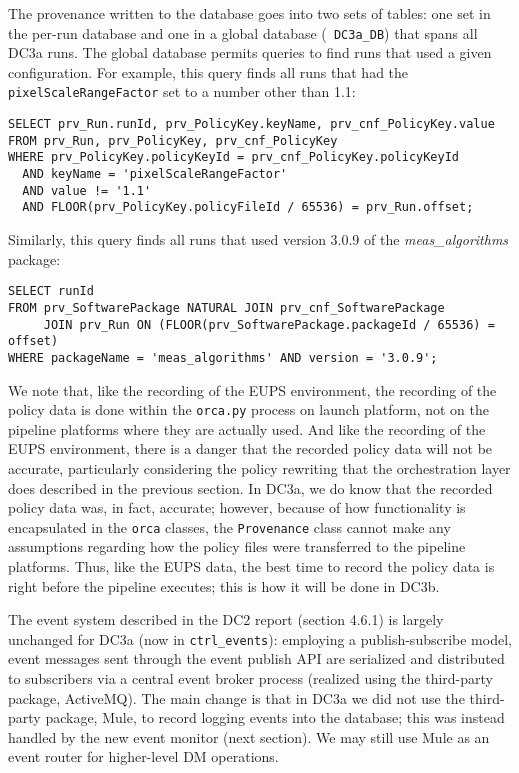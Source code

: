 The provenance written to the database goes into two sets of tables: one
set in the per-run database and one in a global database ({\tt
DC3a\_DB}) that spans all DC3a runs.  The global database permits
queries to find runs that used a given configuration.  For example, this
query finds all runs that had the {\tt pixelScaleRangeFactor} set to a
number other than 1.1:

\begin{verbatim}
SELECT prv_Run.runId, prv_PolicyKey.keyName, prv_cnf_PolicyKey.value
FROM prv_Run, prv_PolicyKey, prv_cnf_PolicyKey
WHERE prv_PolicyKey.policyKeyId = prv_cnf_PolicyKey.policyKeyId
  AND keyName = 'pixelScaleRangeFactor'
  AND value != '1.1'
  AND FLOOR(prv_PolicyKey.policyFileId / 65536) = prv_Run.offset;
\end{verbatim}

Similarly, this query finds all runs that used version 3.0.9 of the {\it
meas\_algorithms} package:

\begin{verbatim}
SELECT runId
FROM prv_SoftwarePackage NATURAL JOIN prv_cnf_SoftwarePackage
     JOIN prv_Run ON (FLOOR(prv_SoftwarePackage.packageId / 65536) = offset)
WHERE packageName = 'meas_algorithms' AND version = '3.0.9';
\end{verbatim}

We note that, like the recording of the EUPS environment, the
recording of the policy data is done within the {\tt orca.py} process
on launch platform, not on the pipeline platforms where they are
actually used.  And like the recording of the EUPS environment, there
is a danger that the recorded policy data will not be accurate,
particularly considering the policy rewriting that the orchestration
layer does described in the previous section.  In DC3a, we do
know that the recorded policy data was, in fact, accurate; however,
because of how functionality is encapsulated in the \texttt{orca} classes, the
{\tt Provenance} class cannot make any assumptions regarding how the
policy files were transferred to the pipeline platforms.  Thus, like
the EUPS data, the best time to record the policy data is right before
the pipeline executes; this is how it will be done in DC3b.  

 \label{sec:events}

The event system described in the DC2 report (section 4.6.1) is
largely unchanged for DC3a (now in {\tt ctrl\_events}):  employing a
publish-subscribe model, event messages sent through the event publish
API are serialized and distributed to subscribers via a central event
broker process (realized using the third-party package, ActiveMQ).
The main change is that in DC3a we did not use the third-party
package, Mule, to record logging events into the database; this was
instead handled by the new event monitor (next section).  We may still
use Mule as an event router for higher-level DM operations.   

